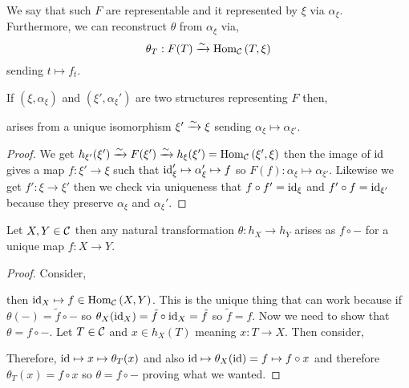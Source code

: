 \documentclass[12pt]{article}
\begin{document}
\begin{rmk}
We say that such $F$ are representable and it represented by $\xi$ via $\alpha_\xi$. Furthermore, we can reconstruct $\theta$ from $\alpha_\xi$ via,
\[ \theta_T : F(T) \xrightarrow{\sim} \mathrm{Hom}_{\mathcal{C}} \left( T, \xi \right) \]
sending $t \mapsto f_t$.
\end{rmk}

\begin{cor}
If $(\xi, \alpha_\xi)$ and $(\xi', \alpha_\xi')$ are two structures representing $F$ then,
\begin{center}
\end{center}
arises from a unique isomorphism $\xi' \xrightarrow{\sim} \xi$ sending $\alpha_\xi \mapsto \alpha_{\xi'}$.
\end{cor}

\begin{proof}
We get $h_{\xi'}(\xi') \xrightarrow{\sim} F(\xi') \xrightarrow{\sim} h_{\xi}(\xi') = \mathrm{Hom}_{\mathcal{C}} \left( \xi', \xi \right)$ then the image of $\mathrm{id}$ gives a map $f : \xi' \to \xi$ such that $\mathrm{id}_\xi' \mapsto \alpha_\xi' \mapsto f$ so $F(f) : \alpha_\xi \mapsto \alpha_{\xi'}$. Likewise we get $f' : \xi \to \xi'$ then we check via uniqueness that $f \circ f' = \mathrm{id}_{\xi}$ and $f' \circ f = \mathrm{id}_{\xi'}$ because they preserve $\alpha_\xi$ and $\alpha_\xi'$. 
\end{proof}

\begin{lemma}[Yoneda]
Let $X, Y \in \mathcal{C}$ then any natural transformation $\theta : h_X \to h_Y$ arises as $f \circ -$ for a unique map $f : X \to Y$.
\end{lemma}

\begin{proof}
Consider,
\begin{center}
\end{center}
then $\mathrm{id}_X \mapsto f \in \mathrm{Hom}_{\mathcal{C}} \left( X, Y \right)$. This is the unique thing that can work because if $\theta(-) = \tilde{f} \circ -$ so $\theta_X(\mathrm{id}_X) = \tilde{f} \circ \mathrm{id}_X = \tilde{f}$ so $\tilde{f} = f$. Now we need to show that $\theta = f \circ -$. Let $T \in \mathcal{C}$ and $x \in h_X(T)$ meaning $x : T \to X$. Then consider,
\begin{center}
\end{center}
Therefore, $\mathrm{id} \mapsto x \mapsto \theta_T(x)$ and also $\mathrm{id} \mapsto \theta_X(\mathrm{id}) = f \mapsto f \circ x$ and therefore $\theta_T(x) = f \circ x$ so $\theta = f \circ -$ proving what we wanted.
\end{proof}
\end{document}
